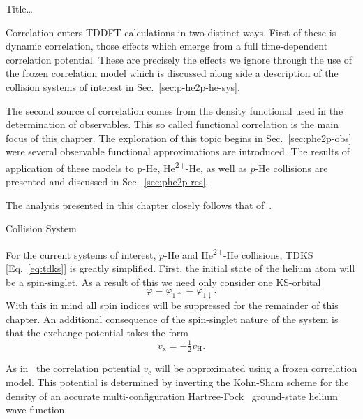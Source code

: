 \documentclass[letterpaper, 11 pt]{report}
\begin{document}
\begin{chapter}{ Title\dots \label{chap:p-he2p-he}} %

   Correlation enters TDDFT calculations in two distinct ways. First of these is dynamic
   correlation, those effects which emerge from a full time-dependent correlation potential. These are
   precisely the effects we ignore through the use of the frozen correlation model which is discussed
   along side a description of the collision systems of interest in Sec.~\ref{sec:p-he2p-he-sys}.

   The second source of correlation comes from the density functional
   used in the determination of observables. This so called functional correlation is the main focus of
   this chapter. The exploration of this topic begins in Sec.~\ref{sec:phe2p-obs} were several
   observable functional approximations are introduced. The results of application of these models to
   p-He, He\textsuperscript{2+}-He, as well as $\bar{p}$-He collisions are presented and discussed in
   Sec.~\ref{sec:phe2p-res}.

   The analysis presented in this chapter closely follows that of~\cite{p-he2p-he}.

   \begin{section}{Collision System \label{sec:p-he2p-he-sys}}

      For the current systems of interest, $p$-He and He\textsuperscript{2+}-He collisions, TDKS
      [Eq.~\eqref{eq:tdks}] is greatly simplified. First, the initial state of the helium atom will be a
      spin-singlet. As a result of this we need only consider one KS-orbital
      \begin{equation} \label{eq:oneorb}
         \varphi = \varphi_{1\uparrow} = \varphi_{1\downarrow}.
      \end{equation}
      With this in mind all spin indices will be suppressed for the remainder of this chapter. An
      additional consequence of the spin-singlet nature of the system is that the exchange potential
      takes the form
      \begin{equation} \label{eq:vxvh}
         v_\mathrm{x} = - \tfrac{1}{2} v_\mathrm{H}.
      \end{equation}

      As in~\cite{pbarhe} the correlation potential $v_\mathrm{c}$ will be approximated using a frozen
      correlation model. This potential is determined by inverting the Kohn-Sham scheme for the density
      of an accurate multi-configuration Hartree-Fock~\cite{mchf} ground-state helium wave function.


\end{section}
\end{chapter}
\end{document}
